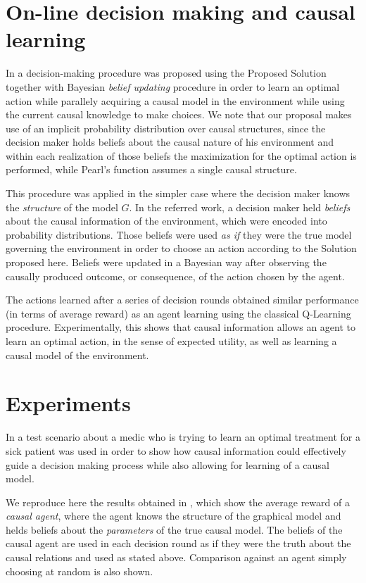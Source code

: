 \documentclass[letterpaper]{article} %
\theoremstyle{plain}
\begin{document}
\section{On-line decision making and causal learning}
In \cite{gonzalez2018playing} a decision-making procedure was proposed using the Proposed Solution together with Bayesian \textit{belief updating} procedure in order to learn an optimal action while parallely acquiring a causal model in the environment while using the current causal knowledge to make choices. We note that our proposal makes use of an implicit probability distribution over causal structures, since the decision maker holds beliefs about the causal nature of his environment and within each realization of those beliefs the maximization for the optimal action is performed, while Pearl's function assumes a single causal structure.

This procedure was applied in the simpler case where the decision maker knows the \textit{structure} of the model $\textit{G}$. In the referred work, a decision maker held \textit{beliefs} about the causal information of the environment, which were encoded into probability distributions. Those beliefs were used \textit{as if} they were the true model governing the environment in order to choose an action according to the Solution proposed here. Beliefs were updated in a Bayesian way after observing the causally produced outcome, or consequence, of the action chosen by the agent. 

The actions learned after a series of decision rounds obtained similar performance (in terms of average reward) as an agent learning using the classical Q-Learning procedure. Experimentally, this shows that causal information allows an agent to learn an optimal action, in the sense of expected utility, as well as learning a causal model of the environment.

\section{Experiments}
In \cite{gonzalez2018playing} a test scenario about a medic who is trying to learn an optimal treatment for a sick patient was used in order to show how causal information could effectively guide a decision making process while also allowing for learning of a causal model. 

We reproduce here the results obtained in \cite{gonzalez2018playing}, which show the average reward of a \textit{causal agent}, where the agent knows the structure of the graphical model and helds beliefs about the \textit{parameters} of the true causal model. The beliefs of the causal agent are used in each decision round as if they were the truth about the causal relations and used as stated above. Comparison against an agent simply choosing at random is also shown.
 
\end{document}

